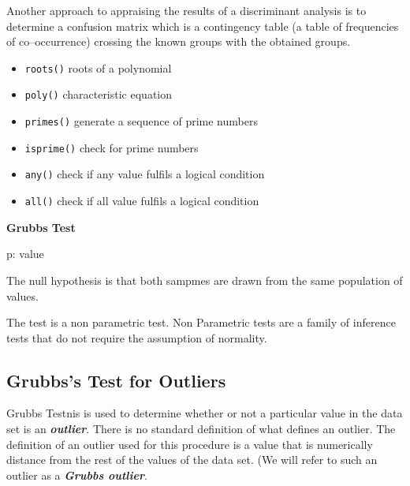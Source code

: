 Another approach to appraising the results of a discriminant analysis is to determine a confusion matrix which is a contingency table (a table of frequencies of co–occurrence) crossing the known groups with the obtained groups.










\begin{itemize}
\item \texttt{roots()} roots of a polynomial
\item \texttt{poly()} characteristic equation
\item \texttt{primes()} generate a sequence of prime numbers
\item \texttt{isprime()} check for prime numbers
\item \texttt{any()} check if any value fulfils a logical condition
\item \texttt{all()} check if all value fulfils a logical condition
\end{itemize}

 \newpage

\textbf{Grubbs Test}

p: value



The null hypothesis is that both sampmes are drawn from the same population of values.

The test is a non parametric test. Non Parametric tests are a family of inference tests that do not require the assumption of normality.
\subsection{Grubbs's Test for Outliers}
Grubbs Testnis is used to determine whether or not a particular value in the data set is an \textbf{\textit{outlier}}. There is no standard definition of what defines an outlier. The definition of an outlier used for this procedure is a value that is numerically distance from the rest of the values of the data set. (We will refer to such an outlier as a \textbf{\textit{Grubbs outlier}}.


